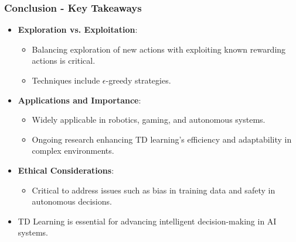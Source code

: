 \documentclass[aspectratio=169]{beamer}
\begin{document}
\begin{frame}[fragile]
    \frametitle{Conclusion - Key Takeaways}
    \begin{itemize}
        \item \textbf{Exploration vs. Exploitation}:
        \begin{itemize}
            \item Balancing exploration of new actions with exploiting known rewarding actions is critical.
            \item Techniques include $\epsilon$-greedy strategies.
        \end{itemize}

        \item \textbf{Applications and Importance}:
        \begin{itemize}
            \item Widely applicable in robotics, gaming, and autonomous systems.
            \item Ongoing research enhancing TD learning's efficiency and adaptability in complex environments.
        \end{itemize}

        \item \textbf{Ethical Considerations}:
        \begin{itemize}
            \item Critical to address issues such as bias in training data and safety in autonomous decisions.
        \end{itemize}
        
        \item TD Learning is essential for advancing intelligent decision-making in AI systems.
    \end{itemize}
\end{frame}
\end{document}
